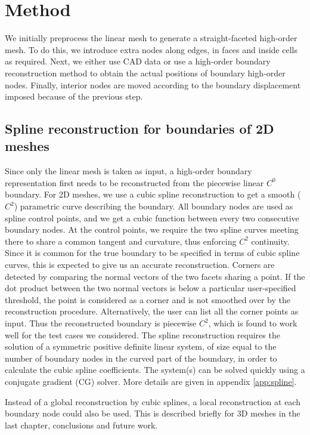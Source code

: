 \section{Method}

We initially preprocess the linear mesh to generate a straight-faceted high-order mesh. To do this, we introduce extra nodes along edges, in faces and inside cells as required. Next, we either use CAD data or use a high-order boundary reconstruction method to obtain the actual positions of boundary high-order nodes. Finally, interior nodes are moved according to the boundary displacement imposed because of the previous step.

\subsection{Spline reconstruction for boundaries of 2D meshes}
\label{subsec:spline2d}
Since only the linear mesh is taken as input, a high-order boundary representation first needs to be reconstructed from the piecewise linear $C^0$ boundary. For 2D meshes, we use a cubic spline reconstruction to get a smooth ($C^2$) parametric curve describing the boundary. All boundary nodes are used as spline control points, and we get a cubic function between every two consecutive boundary nodes. At the control points, we require the two spline curves meeting there to share a common tangent and curvature, thus enforcing $C^2$ continuity. Since it is common for the true boundary to be specified in terms of cubic spline curves, this is expected to give us an accurate reconstruction. Corners are detected by comparing the normal vectors of the two facets sharing a point. If the dot product between the two normal vectors is below a particular user-specified threshold, the point is considered as a corner and is not smoothed over by the reconstruction procedure. Alternatively, the user can list all the corner points as input. Thus the reconstructed boundary is piecewise $C^2$, which is found to work well for the test cases we considered. The spline reconstruction requires the solution of a symmetric positive definite linear system, of size equal to the number of boundary nodes in the curved part of the boundary, in order to calculate the cubic spline coefficients. The system(s) can be solved quickly using a conjugate gradient (CG) solver. More details are given in appendix \ref{app:spline}.

Instead of a global reconstruction by cubic splines, a local reconstruction at each boundary node could also be used. This is described briefly for 3D meshes in the last chapter, conclusions and future work.

